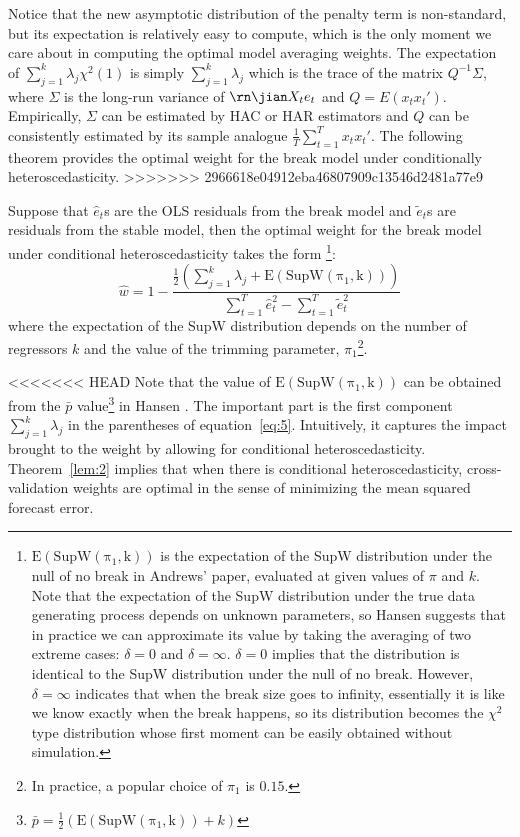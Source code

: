 \begin{lemma}
Notice that the new asymptotic distribution of the penalty term is non-standard, but its expectation is relatively easy to compute, which is the only moment we care about in computing the optimal model averaging weights. The expectation of $\sum_{j=1}^{k} \lambda_j \chi^2(1)$ is simply $\sum_{j=1}^{k} \lambda_j$ which is the trace of the matrix $Q^{-1} \Sigma$, where $\Sigma$ is the long-run variance of $\rn\jian X_t e_t$ and $Q = E(x_t x_t')$. Empirically, $\Sigma$ can be estimated by HAC or HAR estimators and $Q$ can be consistently estimated by its sample analogue $\frac{1}{T}\sum_{t=1}^{T}x_t x_t'$. The following theorem provides the optimal weight for the break model under conditionally heteroscedasticity.
>>>>>>> 2966618e04912eba46807909c13546d2481a77e9

\begin{theorem} \label{lem:2}
Suppose that $\hat{e}_t$s are the OLS residuals from the break model and $\tilde{e}_t$s are residuals from the stable model, then the optimal weight for the break model under conditional heteroscedasticity takes the form \footnote{$\mathrm{E(SupW(\pi_1,k))}$ is the expectation of the SupW distribution under the null of no break in Andrews' paper, evaluated at given values of $\pi$ and $k$. Note that the expectation of the SupW distribution under the true data generating process depends on unknown parameters, so Hansen suggests that in practice we can approximate its value by taking the averaging of two extreme cases: $\delta = 0$ and $\delta = \infty$. $\delta = 0$ implies that the distribution is identical to the SupW distribution under the null of no break. However, $\delta = \infty$ indicates that when the break size goes to infinity, essentially it is like we know exactly when the break happens, so its distribution becomes the $\chi^2$ type distribution whose first moment can be easily obtained without simulation.}:
\begin{equation} \label{eq:5}
	\hat{w} = 1 - \frac{\frac{1}{2}(\sum_{j=1}^{k}\lambda_j + \mathrm{E(SupW(\pi_1,k))})}{\sum_{t=1}^{T}\hat{e}_t^2 - \sum_{t=1}^{T}\tilde{e}_t^2}
\end{equation}
where the expectation of the SupW distribution depends on the number of regressors $k$ and the value of the trimming parameter, $\pi_1$\footnote{In practice, a popular choice of $\pi_1$ is $0.15$.}.
\end{theorem}
<<<<<<< HEAD
Note that the value of $\mathrm{E(SupW(\pi_1,k))}$ can be obtained from the $\bar{p}$ value\footnote{$\bar{p} = \frac{1}{2}(\mathrm{E(SupW(\pi_1,k))} + k)$} in Hansen \cite{hansen2009averaging}. The important part is the first component $\sum_{j=1}^{k}\lambda_j$ in the parentheses of equation~\ref{eq:5}. Intuitively, it captures the impact brought to the weight by allowing for conditional heteroscedasticity. Theorem~\ref{lem:2} implies that when there is conditional heteroscedasticity, cross-validation weights are optimal in the sense of minimizing the mean squared forecast error. 

\end{lemma}
